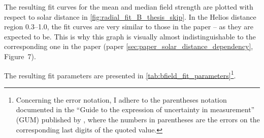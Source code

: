 The resulting fit curves for the mean and median field strength are plotted with respect to solar distance in \autoref{fig:radial_fit_B_thesis_skip}. In the Helios distance region \SIrange{0.3}{1.0}{\au}, the fit curves are very similar to those in the paper -- as they are expected to be. This is why this graph is visually almost indistinguishable to the corresponding one in the paper (paper \autoref{sec:paper_solar_distance_dependency}, Figure~7).
\begin{figure}[htb]
\end{figure}
The resulting fit parameters are presented in \autoref{tab:bfield_fit_parameters}\footnote{
Concerning the error notation, I adhere to the parentheses notation documented in the ``Guide to the expression of uncertainty in measurement'' (GUM) published by \citet{GUM2008}, where the numbers in parentheses are the errors on the corresponding last digits of the quoted value.
}.	%
